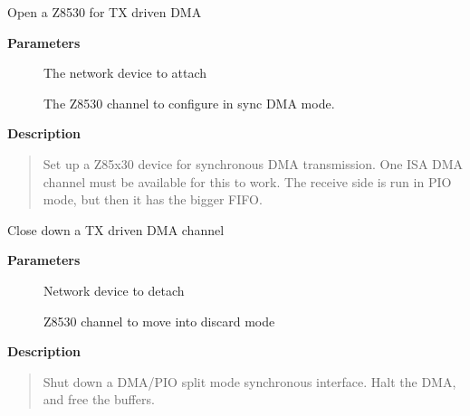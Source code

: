 \documentclass[a4paper,8pt,english]{sphinxmanual}
\begin{document}
\begin{fulllineitems}
\label{networking/z8530book:c.z8530_sync_txdma_open}
Open a Z8530 for TX driven DMA

\end{fulllineitems}


\textbf{Parameters}
\begin{description}
\item[{}] \leavevmode
The network device to attach

\item[{}] \leavevmode
The Z8530 channel to configure in sync DMA mode.

\end{description}

\textbf{Description}
\begin{quote}

Set up a Z85x30 device for synchronous DMA transmission. One
ISA DMA channel must be available for this to work. The receive
side is run in PIO mode, but then it has the bigger FIFO.
\end{quote}

\begin{fulllineitems}
\label{networking/z8530book:c.z8530_sync_txdma_close}
Close down a TX driven DMA channel

\end{fulllineitems}


\textbf{Parameters}
\begin{description}
\item[{}] \leavevmode
Network device to detach

\item[{}] \leavevmode
Z8530 channel to move into discard mode

\end{description}

\textbf{Description}
\begin{quote}

Shut down a DMA/PIO split mode synchronous interface. Halt the DMA,
and  free the buffers.
\end{quote}
\end{document}
